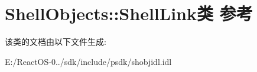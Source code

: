 \hypertarget{class_shell_objects_1_1_shell_link}{}\section{Shell\+Objects\+:\+:Shell\+Link类 参考}
\label{class_shell_objects_1_1_shell_link}


该类的文档由以下文件生成\+:\begin{DoxyCompactItemize}
\item 
E\+:/\+React\+O\+S-\/0../sdk/include/psdk/shobjidl.\+idl\end{DoxyCompactItemize}
